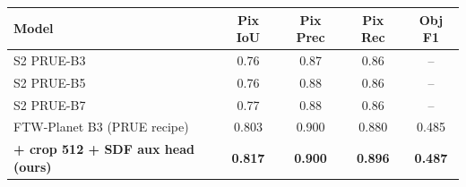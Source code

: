 \begin{tabular}{lcccc}
\toprule
Model & Pix IoU & Pix Prec & Pix Rec & Obj F1 \\
\midrule
S2 PRUE-B3 \cite{kerner2024ftw} & 0.76 & 0.87 & 0.86 & -- \\
S2 PRUE-B5 \cite{kerner2024ftw} & 0.76 & 0.88 & 0.86 & -- \\
S2 PRUE-B7 \cite{kerner2024ftw} & 0.77 & 0.88 & 0.86 & -- \\
\midrule
FTW-Planet B3 (PRUE recipe)            & 0.803 & 0.900 & 0.880 & 0.485 \\
\textbf{+ crop 512 + SDF aux head (ours)}  & \textbf{0.817} & \textbf{0.900} & \textbf{0.896} & \textbf{0.487} \\
\bottomrule
\end{tabular}
